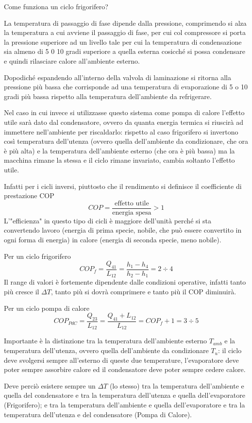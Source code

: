 \begin{adjustwidth}{2in}{}
	Come funziona un ciclo frigorifero? 
	
	La temperatura di passaggio di fase dipende dalla pressione,  comprimendo si alza la temperatura a cui avviene il passaggio di fase, per cui col compressore si porta la pressione superiore ad un livello tale per cui la temperatura di condensazione  sia almeno di 5 0 10 gradi superiore a quella esterna cosicché si possa condensare e quindi rilasciare calore all'ambiente esterno.
	
	Dopodiché espandendo all'interno della valvola di laminazione si ritorna alla pressione più bassa che corrisponde ad una temperatura di evaporazione di 5 o 10 gradi più bassa rispetto alla temperatura dell'ambiente da refrigerare. \newline 
	
	Nel caso in cui invece si utilizzasse questo sistema come pompa di calore l'effetto utile sarà dato dal condensatore, ovvero da quanta energia termica si riuscirà ad immettere nell'ambiente per riscaldarlo: rispetto al caso frigorifero si invertono così temperatura dell'utenza (ovvero quella dell'ambiente da condizionare, che ora è più alta) e la temperatura dell'ambiente esterno (che ora è più bassa) ma la macchina rimane la stessa e il ciclo rimane invariato, cambia soltanto l'effetto utile.\newline 
	
	Infatti per i cicli inversi, piuttosto che il rendimento si definisce il coefficiente di prestazione COP
	\[COP = \dfrac{\text{effetto utile}}{\text{energia spesa}}>1\]
	L'"efficienza" in questo tipo di cicli è maggiore dell'unità perché si sta convertendo lavoro (energia di prima specie, nobile, che può essere convertito in ogni forma di energia) in calore (energia di seconda specie, meno nobile).\newline 
	
	Per un ciclo frigorifero
	\[COP_f = \dfrac{Q_{41}}{L_{12}} = \dfrac{h_1-h_4}{h_2-h_1} = 2\div4\]
	Il range di valori è fortemente dipendente dalle condizioni operative, infatti tanto più cresce il $\Delta T$, tanto più si dovrà comprimere e tanto più il COP diminuirà.\newline 
	
	Per un ciclo pompa di calore 
	\[COP_{PdC} = \dfrac{Q_{23}}{L_{12}} = \dfrac{Q_{41} + L_{12} }{L_{12}} =COP_f + 1 = 3\div5\]
	
	Importante è la distinzione tra la temperatura dell'ambiente esterno $T_{amb}$ e la temperatura dell'utenza, ovvero quella dell'ambiente da condizionare $T_u$: il ciclo deve svolgersi sempre all'esterno di queste due temperature, l'evaporatore deve poter sempre assorbire calore ed il condensatore deve poter sempre cedere calore.
	
	Deve perciò esistere sempre un $\Delta T$ (lo stesso) tra la temperatura dell'ambiente e quella del condensatore e tra la temperatura dell'utenza e quella dell'evaporatore (Frigorifero); e tra la temperatura dell'ambiente e quella dell'evaporatore e tra la temperatura dell'utenza e del condensatore (Pompa di Calore).  
\end{adjustwidth}





